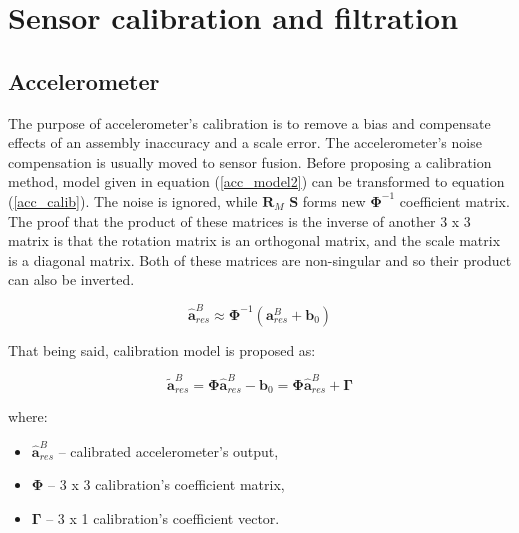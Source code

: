 \section{Sensor calibration and filtration}



\subsection{Accelerometer}

The purpose of accelerometer's calibration is to remove a bias and compensate effects of an assembly inaccuracy and a scale error. The accelerometer's noise compensation is usually moved to sensor fusion. Before proposing a calibration method, model given in equation (\ref{acc_model2}) can be transformed to equation (\ref{acc_calib}). The noise is ignored, while $\bm{R}_M$ $\bm{S}$ forms new $\bm{\Phi}^{-1}$ coefficient matrix. The proof that the product of these matrices is the inverse of another 3 x 3 matrix is that the rotation matrix is an orthogonal matrix, and the scale matrix is a diagonal matrix. Both of these matrices are non-singular and so their product can also be inverted.

\begin{equation}
	\bm{\hat{a}}_{res}^B \approx \bm{\Phi}^{-1} \left( \bm{a}_{res}^B + \bm{b}_0 \right)
	\label{acc_calib}
\end{equation}

That being said, calibration model is proposed as:

\begin{equation}
	\bm{\tilde{a}}_{res}^B = \bm{\Phi} \bm{\hat{a}}_{res}^B - \bm{b}_0 = \bm{\Phi} \bm{\hat{a}}_{res}^B + \bm{\Gamma}
	\label{acc_calib2}
\end{equation}

where:
\begin{itemize}
	\item $\bm{\hat{a}}_{res}^B$ -- calibrated accelerometer's output,
	\item $\bm{\Phi}$ -- 3 x 3 calibration's coefficient matrix,
	\item $\bm{\Gamma}$ -- 3 x 1 calibration's coefficient vector.
\end{itemize}

